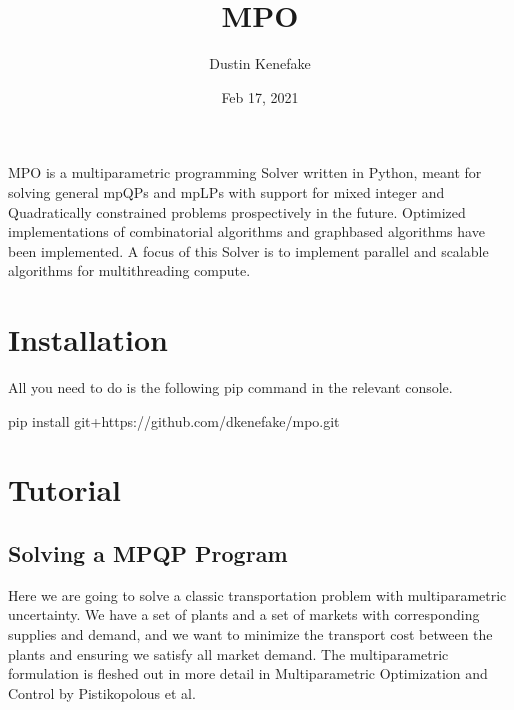 \documentclass[letterpaper,10pt,english]{sphinxmanual}
\title{MPO}
\date{Feb 17, 2021}
\author{Dustin Kenefake}
\begin{document}
\pagestyle{empty}
\sphinxmaketitle
\pagestyle{plain}
\sphinxtableofcontents
\pagestyle{normal}
\label{\detokenize{index::doc}}


\sphinxAtStartPar
MPO is a multiparametric programming Solver written in Python, meant for solving general mpQPs and mpLPs with support for mixed integer and Quadratically constrained problems prospectively in the future. Optimized implementations of combinatorial algorithms and graph\sphinxhyphen{}based algorithms have been implemented. A focus of this Solver is to implement parallel and scalable algorithms for multithreading compute.


\chapter{Installation}
\label{\detokenize{index:installation}}
\sphinxAtStartPar
All you need to do is the following pip command in the relevant console.

\begin{sphinxVerbatim}[commandchars=\\\{\}]
pip install git+https://github.com/dkenefake/mpo.git
\end{sphinxVerbatim}


\chapter{Tutorial}
\label{\detokenize{index:tutorial}}

\section{Solving a MPQP Program}
\label{\detokenize{tutorial:solving-a-mpqp-program}}\label{\detokenize{tutorial::doc}}
\sphinxAtStartPar
Here we are going to solve a classic transportation problem with multiparametric uncertainty. We have a set of plants and a set of markets with corresponding supplies and demand, and we want to minimize the transport cost between the plants and ensuring we satisfy all market demand. The multiparametric formulation is fleshed out in more detail in Multiparametric Optimization and Control by Pistikopolous et al.
\end{document}
